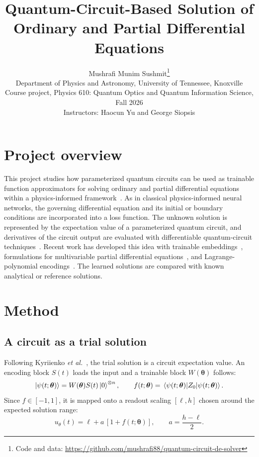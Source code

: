 \documentclass[11pt,a4paper]{article}
\title{Quantum-Circuit-Based Solution of\\ Ordinary and Partial Differential Equations}
\author{Mushrafi Munim Sushmit\thanks{Code and data: \url{https://github.com/mushrafi88/quantum-circuit-de-solver}}\\[2pt]
\small Department of Physics and Astronomy, University of Tennessee, Knoxville\\[4pt]
\small Course project, Physics 610: Quantum Optics and Quantum Information Science, Fall 2026\\
\small Instructors: Haocun Yu and George Siopsis}
\begin{document}
\maketitle
\section{Project overview}\label{sec:overview}
This project studies how parameterized quantum circuits can be used as trainable
function approximators for solving ordinary and partial differential equations
within a physics-informed framework~\cite{raissi2019,cerezo2021vqa}.
As in classical physics-informed neural networks, the governing differential
equation and its initial or boundary conditions are incorporated into a loss
function. The unknown solution is represented by the expectation value of a
parameterized quantum circuit, and derivatives of the circuit output are
evaluated with differentiable quantum-circuit techniques~\cite{kyriienko2021}.
Recent work has developed this idea with trainable embeddings~\cite{teqpinn2025},
formulations for multivariable partial differential equations~\cite{panichi2026},
and Lagrange-polynomial encodings~\cite{hunout2025}. The learned solutions are
compared with known analytical or reference solutions.

\section{Method}\label{sec:theory}
\subsection{A circuit as a trial solution}
Following Kyriienko \emph{et al.}~\cite{kyriienko2021}, the trial solution is a
circuit expectation value. An encoding block $S(t)$ loads the input and a
trainable block $W(\boldsymbol\theta)$ follows:
\begin{equation}
 \ket{\psi(t;\boldsymbol\theta)}=W(\boldsymbol\theta)S(t)\ket0^{\otimes n},
 \qquad f(t;\boldsymbol\theta)=\ev{Z_0}{\psi(t;\boldsymbol\theta)}.
\end{equation}
Since $f\in[-1,1]$, it is mapped onto a readout scaling $[\ell,h]$ chosen around the
expected solution range:
\begin{equation}
 u_\theta(t)=\ell+a\,[1+f(t;\boldsymbol\theta)],\qquad a=\frac{h-\ell}{2}.
 \label{eq:model}
\end{equation}
\end{document}
